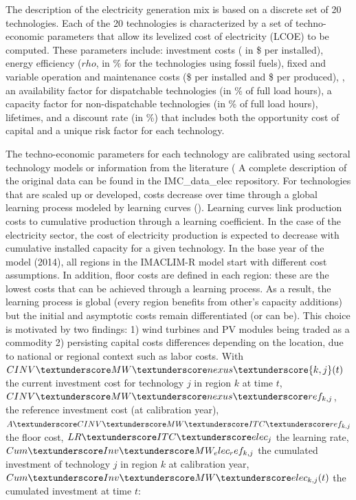 The description of the electricity generation mix is based on a discrete set of  20  technologies. Each of the  20  technologies is characterized by a set of techno-economic parameters that allow its levelized cost of electricity (LCOE) to be computed. These parameters include: investment costs ( in \$ per \kw  installed), energy efficiency ($rho$, in \% for the technologies using fossil fuels), fixed and variable operation and maintenance costs (\$ per \kw installed and \$ per \kwh produced), , an availability factor for dispatchable technologies (in \% of full load hours), a capacity factor for non-dispatchable technologies (in \% of full load hours), lifetimes, and a discount rate (in \%) that includes both the opportunity cost of capital and a unique risk factor for each technology.

The techno-economic parameters for each technology are calibrated using sectoral technology models or information from the literature (%
A complete description of the original data can be found in the IMC_data_elec repository.
For technologies that are scaled up or developed, costs decrease over time through a global learning process modeled by learning curves (\cite{Neij2008}). Learning curves link production costs to cumulative production through a learning coefficient. In the case of the electricity sector, the cost of electricity production is expected to decrease with cumulative installed capacity for a given technology. In the base year of the model (2014), all regions in the IMACLIM-R model start with different cost assumptions. In addition, floor costs are defined in each region: these are the lowest costs that can be achieved through a learning process. As a result, the learning process is global (every region benefits from other's capacity additions) but the initial and asymptotic costs remain differentiated (or can be). This choice is motivated by two findings: 1) wind turbines and PV modules being traded as a commodity 2) persisting capital costs differences depending on the location, due to national or regional context such as labor costs. With $CINV \textunderscore MW\textunderscore nexus\textunderscore {k,j}(t)$ the current investment cost for technology $j$ in region $k$ at time $t$, $CINV\textunderscore MW\textunderscore nexus \textunderscore ref_{k,j}$, the reference investment cost (at calibration year), $A\textunderscore CINV\textunderscore MW\textunderscore ITC\textunderscore ref_{k,j}$ the floor cost,  $LR\textunderscore ITC\textunderscore elec_{j}$ the learning rate, $Cum\textunderscore Inv\textunderscore MW_ elec_ ref_{k,j}$ the cumulated investment of technology $j$ in region $k$ at calibration year, $Cum\textunderscore Inv\textunderscore MW\textunderscore elec_{k,j}(t)$ the cumulated investment at time $t$:


